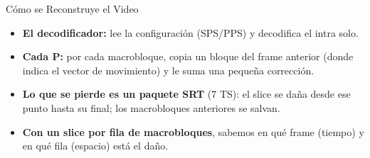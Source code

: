 \documentclass[aspectratio=169, 12pt]{beamer}
\begin{document}
\begin{frame}{Cómo se Reconstruye el Video}
    \begin{itemize}
        \item \textbf{El decodificador:} lee la configuración (SPS/PPS) y decodifica el intra solo.
        \item \textbf{Cada P:} por cada macrobloque, copia un bloque del frame anterior (donde indica el vector de movimiento) y le suma una pequeña corrección.
        \item \textbf{Lo que se pierde es un paquete SRT} (7 TS): el slice se daña desde ese punto hasta su final; los macrobloques anteriores se salvan.
        \item \textbf{Con un slice por fila de macrobloques}, sabemos en qué frame (tiempo) y en qué fila (espacio) está el daño.
    \end{itemize}
\end{frame}
\end{document}
